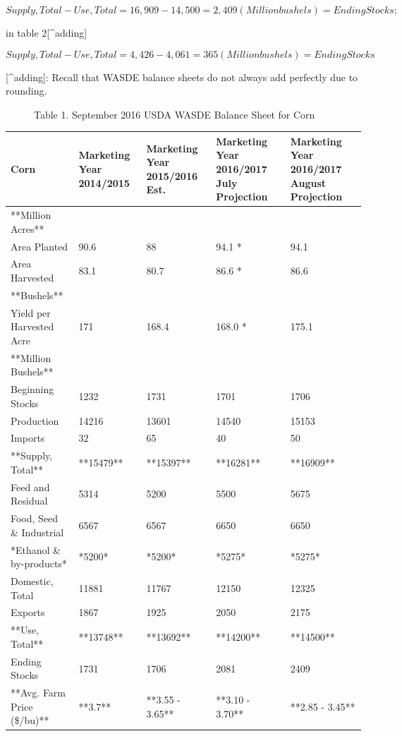 \documentclass[
]{book}
\begin{document}
\[Supply, Total - Use, Total = 16,909 - 14,500 = 2,409 (Million bushels) = Ending Stocks;\]

in table 2{[}\^{}adding{]}

\[Supply, Total - Use, Total = 4,426 - 4,061 = 365 (Million bushels) = Ending Stocks\]

\begin{description}
\item[{[}\^{}adding{]}: Recall that WASDE balance sheets do not always add perfectly due to rounding.]
Table 1. September 2016 USDA WASDE Balance Sheet for Corn
\end{description}

\begin{tabular}{l|l|l|l|l}
\hline
Corn & Marketing Year 2014/2015 & Marketing Year 2015/2016 Est. & Marketing Year 2016/2017 July Projection & Marketing Year 2016/2017 August Projection\\
\hline
**Million Acres** &  &  &  & \\
\hline
Area Planted & 90.6 & 88 & 94.1 * & 94.1\\
\hline
Area Harvested & 83.1 & 80.7 & 86.6 * & 86.6\\
\hline
**Bushels** &  &  &  & \\
\hline
Yield per Harvested Acre & 171 & 168.4 & 168.0 * & 175.1\\
\hline
**Million Bushels** &  &  &  & \\
\hline
Beginning Stocks & 1232 & 1731 & 1701 & 1706\\
\hline
Production & 14216 & 13601 & 14540 & 15153\\
\hline
Imports & 32 & 65 & 40 & 50\\
\hline
**Supply, Total** & **15479** & **15397** & **16281** & **16909**\\
\hline
Feed and Residual & 5314 & 5200 & 5500 & 5675\\
\hline
Food, Seed \& Industrial & 6567 & 6567 & 6650 & 6650\\
\hline
*Ethanol \& by-products* & *5200* & *5200* & *5275* & *5275*\\
\hline
Domestic, Total & 11881 & 11767 & 12150 & 12325\\
\hline
Exports & 1867 & 1925 & 2050 & 2175\\
\hline
**Use, Total** & **13748** & **13692** & **14200** & **14500**\\
\hline
Ending Stocks & 1731 & 1706 & 2081 & 2409\\
\hline
**Avg. Farm Price (\$/bu)** & **3.7** & **3.55 - 3.65** & **3.10 - 3.70** & **2.85 - 3.45**\\
\hline
\end{tabular}
\end{document}

